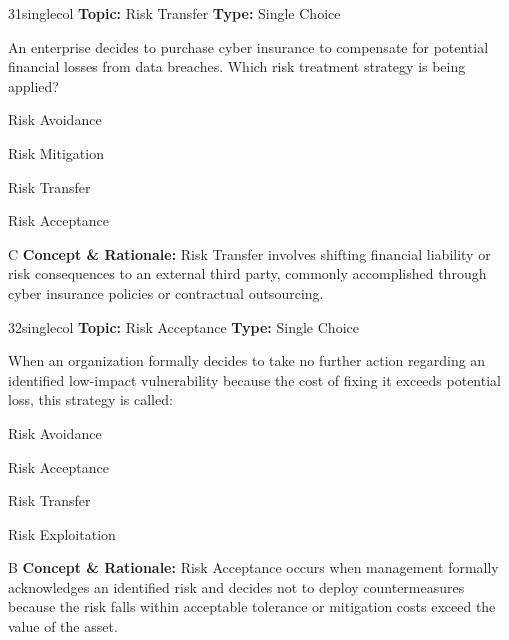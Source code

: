 \begin{qcard}{31}{singlecol}
\textcolor{darkslate!75}{\small\textbf{Topic:} Risk Transfer \hfill \textbf{Type:} Single Choice}\vspace{0.4em}\par
An enterprise decides to purchase cyber insurance to compensate for potential financial losses from data breaches. Which risk treatment strategy is being applied?
\begin{qoptions}
\item Risk Avoidance
\item Risk Mitigation
\item Risk Transfer
\item Risk Acceptance
\end{qoptions}
\end{qcard}
\nopagebreak
\begin{explainbox}{C}
\textbf{Concept \& Rationale:} Risk Transfer involves shifting financial liability or risk consequences to an external third party, commonly accomplished through cyber insurance policies or contractual outsourcing.
\end{explainbox}

\begin{qcard}{32}{singlecol}
\textcolor{darkslate!75}{\small\textbf{Topic:} Risk Acceptance \hfill \textbf{Type:} Single Choice}\vspace{0.4em}\par
When an organization formally decides to take no further action regarding an identified low-impact vulnerability because the cost of fixing it exceeds potential loss, this strategy is called:
\begin{qoptions}
\item Risk Avoidance
\item Risk Acceptance
\item Risk Transfer
\item Risk Exploitation
\end{qoptions}
\end{qcard}
\nopagebreak
\begin{explainbox}{B}
\textbf{Concept \& Rationale:} Risk Acceptance occurs when management formally acknowledges an identified risk and decides not to deploy countermeasures because the risk falls within acceptable tolerance or mitigation costs exceed the value of the asset.
\end{explainbox}

